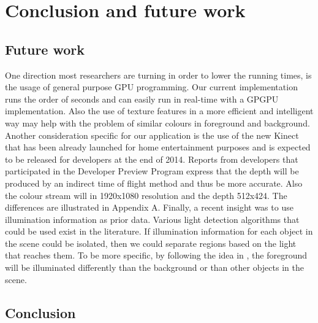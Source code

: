 \chapter{Conclusion and future work}
\label{chap:conclusion-and-future-work}

\section{Future work}
\label{sec:future-work}

One direction most researchers are turning in order to lower the running times, is the usage of general purpose GPU programming. Our current implementation runs the order of seconds and can easily run in real-time with a GPGPU implementation. Also the use of texture features in a more efficient and intelligent way may help with the problem of similar colours in foreground and background. Another consideration specific for our application is the use of the new Kinect that has been already launched for home entertainment purposes and is expected to be released for developers at the end of 2014. Reports from developers that participated in the Developer Preview Program express that the depth will be produced by an indirect time of flight method \cite{kinectscomparison} and thus be more accurate. Also the colour stream will in 1920x1080 resolution and the depth 512x424. The differences are illustrated in Appendix A.
Finally, a recent insight was to use illumination information as prior data. Various light detection algorithms that could be used exist in the literature. If illumination information for each object in the scene could be isolated, then we could separate regions based on the light that reaches them. To be more specific, by following the idea in \cite{flash}, the foreground will be illuminated differently than the background or than other objects in the scene.

\section{Conclusion}
\label{sec:conclusion}


